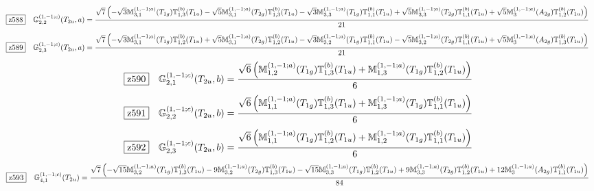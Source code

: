 \documentclass[fleqn,10pt,landscape]{jsarticle}
\begin{document}
\begin{dmath*}
\hspace*{3mm}\fbox{z588}\quad \mathbb{G}_{2,2}^{(1,-1;c)}(T_{2u},a)=\frac{\sqrt{7} \left(- \sqrt{3} \mathbb{M}_{3,1}^{(1,-1;a)}(T_{1g}) \mathbb{T}_{1,3}^{(b)}(T_{1u}) - \sqrt{5} \mathbb{M}_{3,1}^{(1,-1;a)}(T_{2g}) \mathbb{T}_{1,3}^{(b)}(T_{1u}) - \sqrt{3} \mathbb{M}_{3,3}^{(1,-1;a)}(T_{1g}) \mathbb{T}_{1,1}^{(b)}(T_{1u}) + \sqrt{5} \mathbb{M}_{3,3}^{(1,-1;a)}(T_{2g}) \mathbb{T}_{1,1}^{(b)}(T_{1u}) + \sqrt{5} \mathbb{M}_{3}^{(1,-1;a)}(A_{2g}) \mathbb{T}_{1,2}^{(b)}(T_{1u})\right)}{21}
\end{dmath*}
\begin{dmath*}
\hspace*{3mm}\fbox{z589}\quad \mathbb{G}_{2,3}^{(1,-1;c)}(T_{2u},a)=\frac{\sqrt{7} \left(- \sqrt{3} \mathbb{M}_{3,1}^{(1,-1;a)}(T_{1g}) \mathbb{T}_{1,2}^{(b)}(T_{1u}) + \sqrt{5} \mathbb{M}_{3,1}^{(1,-1;a)}(T_{2g}) \mathbb{T}_{1,2}^{(b)}(T_{1u}) - \sqrt{3} \mathbb{M}_{3,2}^{(1,-1;a)}(T_{1g}) \mathbb{T}_{1,1}^{(b)}(T_{1u}) - \sqrt{5} \mathbb{M}_{3,2}^{(1,-1;a)}(T_{2g}) \mathbb{T}_{1,1}^{(b)}(T_{1u}) + \sqrt{5} \mathbb{M}_{3}^{(1,-1;a)}(A_{2g}) \mathbb{T}_{1,3}^{(b)}(T_{1u})\right)}{21}
\end{dmath*}
\begin{dmath*}
\hspace*{3mm}\fbox{z590}\quad \mathbb{G}_{2,1}^{(1,-1;c)}(T_{2u},b)=\frac{\sqrt{6} \left(\mathbb{M}_{1,2}^{(1,-1;a)}(T_{1g}) \mathbb{T}_{1,3}^{(b)}(T_{1u}) + \mathbb{M}_{1,3}^{(1,-1;a)}(T_{1g}) \mathbb{T}_{1,2}^{(b)}(T_{1u})\right)}{6}
\end{dmath*}
\begin{dmath*}
\hspace*{3mm}\fbox{z591}\quad \mathbb{G}_{2,2}^{(1,-1;c)}(T_{2u},b)=\frac{\sqrt{6} \left(\mathbb{M}_{1,1}^{(1,-1;a)}(T_{1g}) \mathbb{T}_{1,3}^{(b)}(T_{1u}) + \mathbb{M}_{1,3}^{(1,-1;a)}(T_{1g}) \mathbb{T}_{1,1}^{(b)}(T_{1u})\right)}{6}
\end{dmath*}
\begin{dmath*}
\hspace*{3mm}\fbox{z592}\quad \mathbb{G}_{2,3}^{(1,-1;c)}(T_{2u},b)=\frac{\sqrt{6} \left(\mathbb{M}_{1,1}^{(1,-1;a)}(T_{1g}) \mathbb{T}_{1,2}^{(b)}(T_{1u}) + \mathbb{M}_{1,2}^{(1,-1;a)}(T_{1g}) \mathbb{T}_{1,1}^{(b)}(T_{1u})\right)}{6}
\end{dmath*}
\begin{dmath*}
\hspace*{3mm}\fbox{z593}\quad \mathbb{G}_{4,1}^{(1,-1;c)}(T_{2u})=\frac{\sqrt{7} \left(- \sqrt{15} \mathbb{M}_{3,2}^{(1,-1;a)}(T_{1g}) \mathbb{T}_{1,3}^{(b)}(T_{1u}) - 9 \mathbb{M}_{3,2}^{(1,-1;a)}(T_{2g}) \mathbb{T}_{1,3}^{(b)}(T_{1u}) - \sqrt{15} \mathbb{M}_{3,3}^{(1,-1;a)}(T_{1g}) \mathbb{T}_{1,2}^{(b)}(T_{1u}) + 9 \mathbb{M}_{3,3}^{(1,-1;a)}(T_{2g}) \mathbb{T}_{1,2}^{(b)}(T_{1u}) + 12 \mathbb{M}_{3}^{(1,-1;a)}(A_{2g}) \mathbb{T}_{1,1}^{(b)}(T_{1u})\right)}{84}
\end{dmath*}
\end{document}
